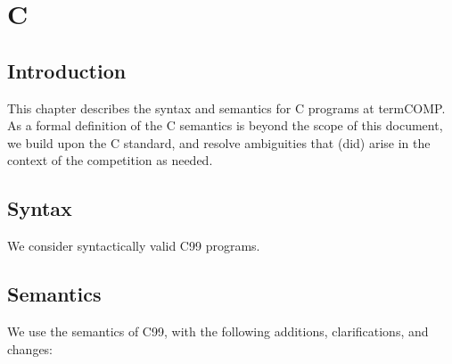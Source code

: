 \chapter{C}
\label{chap:c}

\section{Introduction}

This chapter describes the syntax and semantics for C programs at termCOMP.
% 
As a formal definition of the C semantics is beyond the scope of this document, we build upon the C standard, and resolve ambiguities that (did) arise in the context of the competition as needed.

\section{Syntax}

We consider syntactically valid C99 programs.

\section{Semantics}

We use the semantics of C99, with the following additions, clarifications, and changes:

